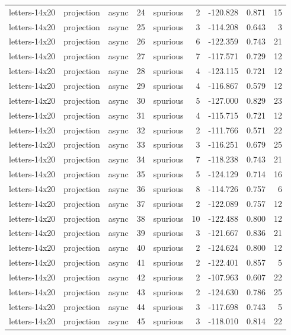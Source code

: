 \begin{tabular}{lllrlrrrr}
letters-14x20 & projection & async & 24 & spurious & 2 & -120.828 & 0.871 & 15 \\
letters-14x20 & projection & async & 25 & spurious & 3 & -114.208 & 0.643 & 3 \\
letters-14x20 & projection & async & 26 & spurious & 6 & -122.359 & 0.743 & 21 \\
letters-14x20 & projection & async & 27 & spurious & 7 & -117.571 & 0.729 & 12 \\
letters-14x20 & projection & async & 28 & spurious & 4 & -123.115 & 0.721 & 12 \\
letters-14x20 & projection & async & 29 & spurious & 4 & -116.867 & 0.579 & 12 \\
letters-14x20 & projection & async & 30 & spurious & 5 & -127.000 & 0.829 & 23 \\
letters-14x20 & projection & async & 31 & spurious & 4 & -115.715 & 0.721 & 12 \\
letters-14x20 & projection & async & 32 & spurious & 2 & -111.766 & 0.571 & 22 \\
letters-14x20 & projection & async & 33 & spurious & 3 & -116.251 & 0.679 & 25 \\
letters-14x20 & projection & async & 34 & spurious & 7 & -118.238 & 0.743 & 21 \\
letters-14x20 & projection & async & 35 & spurious & 5 & -124.129 & 0.714 & 16 \\
letters-14x20 & projection & async & 36 & spurious & 8 & -114.726 & 0.757 & 6 \\
letters-14x20 & projection & async & 37 & spurious & 2 & -122.089 & 0.757 & 12 \\
letters-14x20 & projection & async & 38 & spurious & 10 & -122.488 & 0.800 & 12 \\
letters-14x20 & projection & async & 39 & spurious & 3 & -121.667 & 0.836 & 21 \\
letters-14x20 & projection & async & 40 & spurious & 2 & -124.624 & 0.800 & 12 \\
letters-14x20 & projection & async & 41 & spurious & 2 & -122.401 & 0.857 & 5 \\
letters-14x20 & projection & async & 42 & spurious & 2 & -107.963 & 0.607 & 22 \\
letters-14x20 & projection & async & 43 & spurious & 2 & -124.630 & 0.786 & 25 \\
letters-14x20 & projection & async & 44 & spurious & 3 & -117.698 & 0.743 & 5 \\
letters-14x20 & projection & async & 45 & spurious & 3 & -118.010 & 0.814 & 22 \\

\end{tabular}
